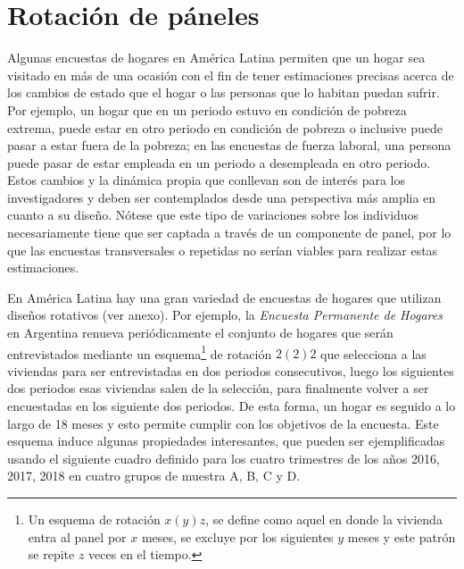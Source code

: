 \hypertarget{rotacion-de-paneles}{%
\section{Rotación de páneles}\label{rotacion-de-paneles}}

Algunas encuestas de hogares en América Latina permiten que un hogar sea visitado en más de una ocasión con el fin de tener estimaciones precisas acerca de los cambios de estado que el hogar o las personas que lo habitan puedan sufrir. Por ejemplo, un hogar que en un periodo estuvo en condición de pobreza extrema, puede estar en otro periodo en condición de pobreza o inclusive puede pasar a estar fuera de la pobreza; en las encuestas de fuerza laboral, una persona puede pasar de estar empleada en un periodo a desempleada en otro periodo. Estos cambios y la dinámica propia que conllevan son de interés para los investigadores y deben ser contemplados desde una perspectiva más amplia en cuanto a su diseño. Nótese que este tipo de variaciones sobre los individuos necesariamente tiene que ser captada a través de un componente de panel, por lo que las encuestas transversales o repetidas no serían viables para realizar estas estimaciones.

En América Latina hay una gran variedad de encuestas de hogares que utilizan diseños rotativos (ver anexo). Por ejemplo, la \emph{Encuesta Permanente de Hogares} en Argentina renueva periódicamente el conjunto de hogares que serán entrevistados mediante un esquema\footnote{Un esquema de rotación \(x(y)z\), se define como aquel en donde la vivienda entra al panel por \(x\) meses, se excluye por los siguientes \(y\) meses y este patrón se repite \(z\) veces en el tiempo.} de rotación \(2(2)2\) que selecciona a las viviendas para ser entrevistadas en dos periodos consecutivos, luego los siguientes dos periodos esas viviendas salen de la selección, para finalmente volver a ser encuestadas en los siguiente dos periodos. De esta forma, un hogar es seguido a lo largo de 18 meses y esto permite cumplir con los objetivos de la encuesta. Este esquema induce algunas propiedades interesantes, que pueden ser ejemplificadas usando el siguiente cuadro definido para los cuatro trimestres de los años 2016, 2017, 2018 en cuatro grupos de muestra A, B, C y D.

